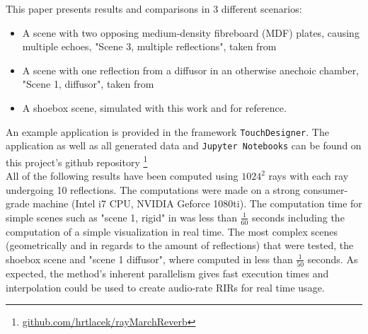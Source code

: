 \documentclass[twoside,a4paper]{article}
\begin{document}
This paper presents results and comparisons in 3 different scenarios:
\begin{itemize}
\item A scene with two opposing medium-density fibreboard (MDF) plates, causing multiple echoes, "Scene 3, multiple reflections", taken from \cite{brinkmann_round_2019}
\item A scene with one reflection from a diffusor in an otherwise anechoic chamber, "Scene 1, diffusor", taken from \cite{brinkmann_round_2019}
\item A shoebox scene, simulated with this work and \cite{lehmann_fast_2020} for reference.
\end{itemize}
An example application is provided in the framework \texttt{TouchDesigner}. The application as well as all generated data and \texttt{Jupyter Notebooks} can be found on this project's github repository \footnote{ \href{https://github.com/hrtlacek/rayMarchReverb}{github.com/hrtlacek/rayMarchReverb}} \\
All of the following results have been computed using $1024^2$ rays with each ray undergoing 10 reflections. The computations were made on a strong consumer-grade machine (Intel i7 CPU, NVIDIA Geforce 1080ti). The computation time for simple scenes such as "scene 1, rigid" in \cite{brinkmann_round_2019} was less than $\frac{1}{60}$ seconds including the computation of a simple visualization in real time. The most complex scenes (geometrically and in regards to the amount of reflections) that were tested, the shoebox scene and "scene 1 diffusor", where computed in less than $\frac{1}{50}$ seconds. As expected, the method's inherent parallelism gives fast execution times and interpolation could be used to create audio-rate RIRs for real time usage. \

\end{document}
